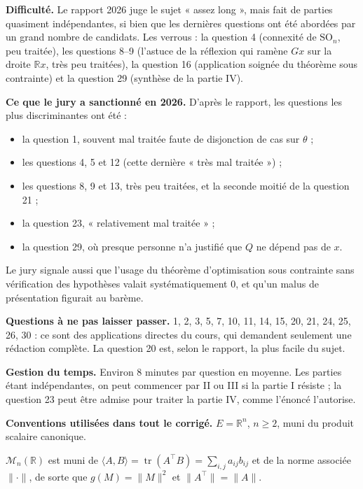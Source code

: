 \documentclass[11pt,a4paper]{article}
\providecommand{\tightlist}{\setlength{\itemsep}{0pt}\setlength{\parskip}{0pt}}
\begin{document}
\textbf{Difficulté.} Le rapport 2026 juge le sujet « assez long », mais fait de parties quasiment indépendantes, si bien que les dernières questions ont été abordées par un grand nombre de candidats. Les verrous : la question 4 (connexité de \({\mathrm{SO}}_n\), peu traitée), les questions 8--9 (l'astuce de la réflexion qui ramène \(Gx\) sur la droite \(\mathbb{R}x\), très peu traitées), la question 16 (application soignée du théorème sous contrainte) et la question 29 (synthèse de la partie IV).

\textbf{Ce que le jury a sanctionné en 2026.} D'après le rapport, les questions les plus discriminantes ont été :

\begin{itemize}
\tightlist
\item
  la question 1, souvent mal traitée faute de disjonction de cas sur \(\theta\) ;
\item
  les questions 4, 5 et 12 (cette dernière « très mal traitée ») ;
\item
  les questions 8, 9 et 13, très peu traitées, et la seconde moitié de la question 21 ;
\item
  la question 23, « relativement mal traitée » ;
\item
  la question 29, où presque personne n'a justifié que \(Q\) ne dépend pas de \(x\).
\end{itemize}

Le jury signale aussi que l'usage du théorème d'optimisation sous contrainte sans vérification des hypothèses valait systématiquement 0, et qu'un malus de présentation figurait au barème.

\textbf{Questions à ne pas laisser passer.} 1, 2, 3, 5, 7, 10, 11, 14, 15, 20, 21, 24, 25, 26, 30 : ce sont des applications directes du cours, qui demandent seulement une rédaction complète. La question 20 est, selon le rapport, la plus facile du sujet.

\textbf{Gestion du temps.} Environ 8 minutes par question en moyenne. Les parties étant indépendantes, on peut commencer par II ou III si la partie I résiste ; la question 23 peut être admise pour traiter la partie IV, comme l'énoncé l'autorise.

\textbf{Conventions utilisées dans tout le corrigé.} \(E={\mathbb{R}}^n\), \(n\ge2\), muni du produit scalaire canonique.

\({\mathcal{M}}_n(\mathbb{R})\) est muni de \(\langle A,\allowbreak B\rangle=\operatorname{tr}(A^\top B)=\sum_{i,j}a_{ij}b_{ij}\) et de la norme associée \(\|\cdot\|\), de sorte que \(g(M)=\|M\|^2\) et \(\|A^\top\|=\|A\|\).
\end{document}
